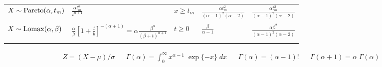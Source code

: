 \begin{tabular}{lllll}
  \\
$X \sim {\rm Pareto}(\alpha, t_m)$ & $\frac{\alpha t_m^{\alpha}}{t^{\alpha+1}}$  &  $x \geq t_m$  & $\frac{\alpha t_m^2}{(\alpha - 1)^2 (\alpha - 2)}$ &  $\frac{\alpha t_m^2}{(\alpha - 1)^2 (\alpha - 2)}$ \\
\\
$X \sim {\rm Lomax}(\alpha, \beta)$ & $\frac{\alpha}{\beta} \left[1 + \frac{t}{b} \right]^{-(\alpha+1)} = \alpha \frac{\beta^\alpha}{(\beta+t)^{\alpha + 1}}$  &  $t \geq 0$  & $\frac{\beta}{\alpha - 1}$ &  $\frac{\alpha \beta^2}{(\alpha - 1)^2 (\alpha - 2)}$ \\
\vspace{0.2cm}\\
\hline
\end{tabular}


\begin{align*}
& Z = (X-\mu)/\sigma &
&\Gamma(\alpha) = \int_0^{\infty} x^{\alpha-1} \; \exp\{-x\} \; dx &
& \Gamma(\alpha) = (\alpha-1)! &
& \Gamma(\alpha+1) = \alpha\;\Gamma(\alpha)
\end{align*}


